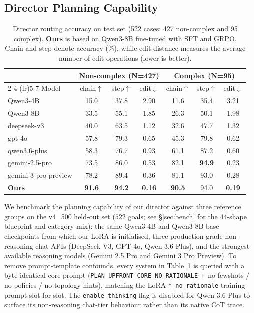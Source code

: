 \subsection{Director Planning Capability}
\label{sec:eval}

\begin{table}[!ht]
\centering
\caption{Director routing accuracy on test set (522 cases: 427 non-complex and 95 complex). \textbf{Ours} is based on Qwen3-8B fine-tuned with SFT and GRPO. Chain and step denote accuracy (\%), while edit distance measures the average number of edit operations (lower is better).}
\label{tab:director_routing_v4500}
\small
\setlength{\tabcolsep}{4.5pt}
\begin{tabular}{l|ccc|ccc}
\toprule
 & \multicolumn{3}{c|}{Non-complex (N=427)} & \multicolumn{3}{c}{Complex (N=95)} \\
\cmidrule(lr){2-4} \cmidrule(lr){5-7}
Model
& chain$\uparrow$ & step$\uparrow$ & edit$\downarrow$
& chain$\uparrow$ & step$\uparrow$ & edit$\downarrow$ \\
\midrule

Qwen3-4B & 15.0 & 37.8 & 2.90 & 11.6 & 35.4 & 3.21 \\
Qwen3-8B & 33.5 & 55.1 & 1.85 & 26.3 & 50.1 & 1.98 \\

deepseek-v3 & 40.0 & 63.5 & 1.12 & 32.6 & 47.7 & 1.32 \\
gpt-4o      & 57.8 & 79.3 & 0.65 & 45.3 & 79.8 & 0.62 \\
qwen3.6-plus & 58.3 & 76.7 & 0.93 & 61.1 & 87.2 & 0.60 \\

gemini-2.5-pro       & 73.5 & 86.0 & 0.53 & 82.1 & \textbf{94.9} & 0.23 \\
gemini-3-pro-preview & 78.2 & 89.4 & 0.36 & 81.1 & 93.0 & 0.28 \\

\midrule
\textbf{Ours}
& \textbf{91.6} & \textbf{94.2} & \textbf{0.16}
& \textbf{90.5} & 94.0 & \textbf{0.19} \\

\bottomrule
\end{tabular}
\end{table}

We benchmark the planning capability of our director against three
reference groups on the v4\_500 held-out set ($522$ goals; see
\S\ref{sec:bench} for the $44$-shape blueprint and category mix):
the same Qwen3-4B and Qwen3-8B base checkpoints from which our LoRA
is initialised, three production-grade non-reasoning chat APIs
(DeepSeek V3, GPT-4o, Qwen 3.6-Plus), and the strongest available
reasoning models (Gemini 2.5 Pro and Gemini 3 Pro Preview). To
remove prompt-template confounds, every system in
Table~\ref{tab:director_routing_v4500} is queried with a byte-identical
core prompt (\texttt{PLAN\_UPFRONT\_CORE\_NO\_RATIONALE} + no fewshots
/ no policies / no topology hints), matching the LoRA
\texttt{*\_no\_rationale} training prompt slot-for-slot. The
\texttt{enable\_thinking} flag is disabled for Qwen 3.6-Plus to
surface its non-reasoning chat-tier behaviour rather than its native
CoT trace.


